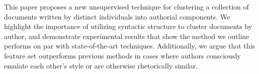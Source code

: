 This paper proposes a new unsupervised technique for clustering a collection of documents written by distinct individuals into authorial components. We highlight the importance of utilizing syntactic structure to cluster documents by author, and demonstrate experimental results that show the method we outline performs on par with state-of-the-art techniques. Additionally, we argue that this feature set outperforms previous methods in cases where authors consciously emulate each other's style or are otherwise rhetorically similar.
